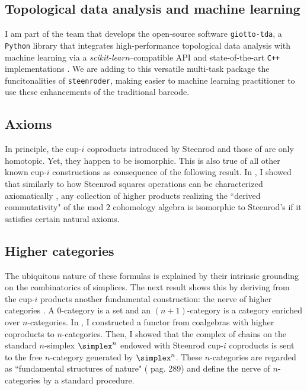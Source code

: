 \subsection{Topological data analysis and machine learning} \label{ss:giotto}

 I am part of the team that develops the open-source software \texttt{giotto-tda}, a \texttt{Python} library that integrates high-performance topological data analysis with machine learning via a \emph{scikit-learn}--compatible API and state-of-the-art \texttt{C++} implementations \cite{medina2021giotto}.
We are adding to this versatile multi-task package the funcitonalities of \texttt{steenroder}, making easier to machine learning practitioner to use these enhancements of the traditional barcode.

\subsection{Axioms}

In principle, the cup-$i$ coproducts introduced by Steenrod \cite{steenrod1947products} and those of \cite{medina2021newformulas} are only homotopic.
Yet, they happen to be isomorphic.
This is also true of all other known cup-$i$ constructions \cite{gonzalez-diaz1999steenrod, mcclure2003multivariable, berger2004combinatorial, medina2020prop1} as consequence of the following result.
In \cite{medina2018axiomatic}, I showed that similarly to how Steenrod squares operations can be characterized axiomatically \cite{steenrod1962cohomology}, any collection of higher products realizing the ``derived commutativity" of the mod $2$ cohomology algebra is isomorphic to Steenrod's if it satisfies certain natural axioms.

\subsection{Higher categories}

The ubiquitous nature of these formulas is explained by their intrinsic grounding on the combinatorics of simplices.
The next result shows this by deriving from the cup-$i$ products another fundamental construction: the nerve of higher categories \cite{street1987orientals}.
A $0$-category is a set and an $(n+1)$-category is a category enriched over $n$-categories.
In \cite{medina2020globular}, I constructed a functor from coalgebras with higher coproducts to $n$-categories.
Then, I showed that the complex of chains on the standard $n$-simplex $\simplex^n$ endowed with Steenrod cup-$i$ coproducts is sent to the free $n$-category generated by $\simplex^n$.
These $n$-categories are regarded as ``fundamental structures of nature" (\cite{street1987orientals} pag. 289) and define the nerve of $n$-categories by a standard procedure.

